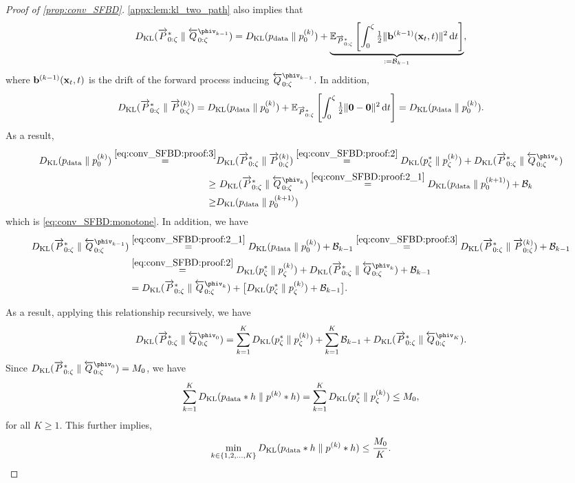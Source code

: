 \begin{proof}[Proof of \cref{prop:conv_SFBD}]
\cref{appx:lem:kl_two_path} also implies that 
\begin{align}
	\KL{\fwdM^*}{\bwdM^{\phiv_{k-1}}} = \KL{p_\text{data}}{p_0^{(k)}} + \underbrace{\Eb_{\fwdM^*}\left[\int_0^\zeta \tfrac{1}{2} \|\bv^{(k-1)}(\xv_t, t) \|^2 \diff t \right]}_{:= \Bc_{k-1}}, \label{eq:conv_SFBD:proof:2_1}
\end{align}
where $\mathbf{b}^{(k-1)}(\mathbf{x}_t, t)$ is the drift of the forward process inducing $\bwdM^{\phiv_{k-1}}$.
In addition, 
\begin{align}
	D_{\mathrm{KL}}({\overrightarrow{P}_{0:\zeta}^*} \; \| \; {\overrightarrow{P}_{0:\zeta}^{(k)}}) = D_{\mathrm{KL}}({p_\text{data}} \; \| \; {p_0^{(k)}}) + \mathbb{E}_{\overrightarrow{P}_{0:\zeta}^*}\left[\int_0^\zeta \tfrac{1}{2} \|\mathbf{0} - \mathbf{0} \|^2 \,\mathrm{d} t\right] = D_{\mathrm{KL}}({p_\text{data}} \; \| \; {p_0^{(k)}}). \label{eq:conv_SFBD:proof:3}
\end{align}
As a result, 
\begin{align*}
	\KL{p_\text{data}}{p_0^{(k)}}
	\overset{\eqref{eq:conv_SFBD:proof:3}}{=}& \KL{\fwdM^*}{\fwdM^{(k)}} 	
	\overset{\eqref{eq:conv_SFBD:proof:2}}{=} \KL{p^*_\zeta}{p_\zeta^{(k)}} + \KL{\fwdM^*}{\bwdM^{\phiv_{k}}} \\
	\geq & ~ \KL{\fwdM^*}{\bwdM^{\phiv_{k}}}
	\overset{\eqref{eq:conv_SFBD:proof:2_1}}{=} \KL{p_\text{data}}{p_0^{(k+1)}} + \Bc_k \\
	\geq & \KL{p_\text{data}}{p_0^{(k+1)}}
\end{align*}
which is \eqref{eq:conv_SFBD:monotone}. In addition, we have
\begin{align*}
	\KL{\fwdM^*}{\bwdM^{\phiv_{k-1}}} 
	&\overset{\eqref{eq:conv_SFBD:proof:2_1}}{=} \KL{p_\text{data}}{p_0^{(k)}} + \Bc_{k-1}
	\overset{\eqref{eq:conv_SFBD:proof:3}}{=} \KL{\fwdM^*}{\fwdM^{(k)}} + \Bc_{k-1} \\ 
	&\overset{\eqref{eq:conv_SFBD:proof:2}}{=} \KL{p^*_\zeta}{p_\zeta^{(k)}} + \KL{\fwdM^*}{\bwdM^{\phiv_{k}}}  + \Bc_{k-1} \\
	&= \KL{\fwdM^*}{\bwdM^{\phiv_{k}}}  + \big[\KL{p^*_\zeta}{p_\zeta^{(k)}} +  \Bc_{k-1}\big].                                                                                                                                               
\end{align*}	


As a result, applying this relationship recursively, we have
\begin{align}
	\KL{\fwdM^*}{\bwdM^{\phiv_{0}}} = \sum_{k = 1}^K \KL{p^*_\zeta}{p_\zeta^{(k)}} + \sum_{k=1}^{K} \Bc_{k-1} + \KL{\fwdM^*}{\bwdM^{\phiv_{K}}}. 
\end{align}
Since $\KL{\fwdM^*}{\bwdM^{\phiv_{0}}} = M_0$, we have
\begin{align}
	\sum_{k = 1}^K D_{\mathrm{KL}}({p_\text{data} * h} \; \| \; {p^{(k)} * h}) = \sum_{k = 1}^K D_{\mathrm{KL}}({p^*_\zeta} \; \| \; {p_\zeta^{(k)}}) \leq M_0,
\end{align}
for all $K \geq 1$. This further implies, 
\begin{align}
	\min_{k \in \{1, 2, \ldots, K\}}D_{\mathrm{KL}}({p_\text{data} * h} \; \| \; {p^{(k)} * h}) \leq \frac{M_0}{K}. 
\end{align}



\end{proof}
